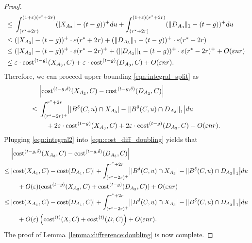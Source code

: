 \documentclass[11pt,letterpaper]{article}
\theoremstyle{definition}
\newcommand{\eps}{\varepsilon}
\DeclarePairedDelimiter{\abs}{\lvert}{\rvert}
\DeclarePairedDelimiter{\norm}{\lVert}{\rVert}
\begin{document}
\begin{proof}
\begin{align*}
		\leq{} & \int_{(r^\ast+2r)}^{(1+\eps)(r^\ast+2r)} (\abs{X_{A_3}}-(t-g))^+ du + \int_{(r^\ast+2r)}^{(1+\eps)(r^\ast+2r)} (\norm{D_{A_3}}_1 - (t-g))^+ du \\
		\leq{} & (\abs{X_{A_3}}-(t-g))^+ \cdot \eps (r^\ast + 2r)  + (\norm{D_{A_3}}_1 - (t-g))^+ \cdot \eps (r^\ast + 2r) \\
		\leq{} & (\abs{X_{A_3}}-(t-g))^+ \cdot \eps (r^\ast - 2r)^+  + (\norm{D_{A_3}}_1 - (t-g))^+ \cdot \eps (r^\ast - 2r)^+ + O(\eps n r) \\
		\leq{} & \eps\cdot \cost[t-g](X_{A_3},C) + \eps\cdot \cost[t-g](D_{A_3},C) + O(\eps n r).
	\end{align*}
	Therefore, we can proceed upper bounding \eqref{eqn:integral_split} as
	\begin{equation}\label{eqn:integral2}
	\begin{aligned}
		&\abs*{\cost[t-g,\delta](X_{A_3},C)-\cost[t-g,\delta](D_{A_3},C)} \\
		\leq{} & \int_{(r^\ast-2r)^+}^{r^\ast+2r} \abs*{ |B^\delta(C,u)\cap X_{A_3}|-\norm[big]{B^\delta(C,u)\cap D_{A_3}}_1 } du \\
		&\quad + 2\eps\cdot \cost[t-g](X_{A_3},C) + 2\eps\cdot \cost[t-g](D_{A_3},C) + O(\eps n r).
	\end{aligned}
	\end{equation}
	Plugging \eqref{eqn:integral2} into \eqref{eqn:cost_diff_doubling} yields that
	\begin{align*}
		        & \abs*{\cost[t-g,\delta](X_{A_3},C)-\cost[t-g,\delta](D_{A_3},C)} \\
		\leq{}  & \abs{\cost(X_{A_1},C)-\cost(D_{A_1},C)} + \int_{(r^\ast-2r)^+}^{r^\ast+2r} \abs*{ |B^\delta(C,u)\cap X_{A_3}|-\norm[big]{B^\delta(C,u)\cap D_{A_3}}_1 } du  \\
			    & \quad + O(\eps)(\cost[t-g](X_{A_3},C) + \cost[t-g](D_{A_3},C)) + O(\eps n r) \\
		\leq{}  & \abs{\cost(X_{A_1},C)-\cost(D_{A_1},C)} + \int_{(r^\ast-2r)^+}^{r^\ast+2r} \abs*{ |B^\delta(C,u)\cap X_{A_3}|-\norm[big]{B^\delta(C,u)\cap D_{A_3}}_1 } du \\
				& \quad + O(\eps)\left( \cost[t](X,C) + \cost[t](D, C) \right) + O(\eps n r).
	\end{align*}
	The proof of Lemma~\ref{lemma:diffrerence:doubling} is now complete.

\end{proof}
\end{document}

